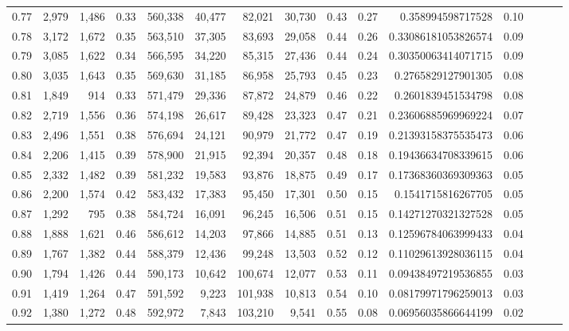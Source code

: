 \begin{tabular}{rrrrrrrrrrrrrrr}
0.77 &   2,979 &  1,486 &  0.33 &  560,338 &   40,477 &   82,021 &   30,730 &  0.43 &  0.27 &     0.358994598717528 &      0.10 \\
0.78 &   3,172 &  1,672 &  0.35 &  563,510 &   37,305 &   83,693 &   29,058 &  0.44 &  0.26 &   0.33086181053826574 &      0.09 \\
0.79 &   3,085 &  1,622 &  0.34 &  566,595 &   34,220 &   85,315 &   27,436 &  0.44 &  0.24 &   0.30350063414071715 &      0.09 \\
0.80 &   3,035 &  1,643 &  0.35 &  569,630 &   31,185 &   86,958 &   25,793 &  0.45 &  0.23 &    0.2765829127901305 &      0.08 \\
0.81 &   1,849 &    914 &  0.33 &  571,479 &   29,336 &   87,872 &   24,879 &  0.46 &  0.22 &    0.2601839451534798 &      0.08 \\
0.82 &   2,719 &  1,556 &  0.36 &  574,198 &   26,617 &   89,428 &   23,323 &  0.47 &  0.21 &   0.23606885969969224 &      0.07 \\
0.83 &   2,496 &  1,551 &  0.38 &  576,694 &   24,121 &   90,979 &   21,772 &  0.47 &  0.19 &   0.21393158375535473 &      0.06 \\
0.84 &   2,206 &  1,415 &  0.39 &  578,900 &   21,915 &   92,394 &   20,357 &  0.48 &  0.18 &   0.19436634708339615 &      0.06 \\
0.85 &   2,332 &  1,482 &  0.39 &  581,232 &   19,583 &   93,876 &   18,875 &  0.49 &  0.17 &   0.17368360369309363 &      0.05 \\
0.86 &   2,200 &  1,574 &  0.42 &  583,432 &   17,383 &   95,450 &   17,301 &  0.50 &  0.15 &    0.1541715816267705 &      0.05 \\
0.87 &   1,292 &    795 &  0.38 &  584,724 &   16,091 &   96,245 &   16,506 &  0.51 &  0.15 &   0.14271270321327528 &      0.05 \\
0.88 &   1,888 &  1,621 &  0.46 &  586,612 &   14,203 &   97,866 &   14,885 &  0.51 &  0.13 &   0.12596784063999433 &      0.04 \\
0.89 &   1,767 &  1,382 &  0.44 &  588,379 &   12,436 &   99,248 &   13,503 &  0.52 &  0.12 &   0.11029613928036115 &      0.04 \\
0.90 &   1,794 &  1,426 &  0.44 &  590,173 &   10,642 &  100,674 &   12,077 &  0.53 &  0.11 &   0.09438497219536855 &      0.03 \\
0.91 &   1,419 &  1,264 &  0.47 &  591,592 &    9,223 &  101,938 &   10,813 &  0.54 &  0.10 &   0.08179971796259013 &      0.03 \\
0.92 &   1,380 &  1,272 &  0.48 &  592,972 &    7,843 &  103,210 &    9,541 &  0.55 &  0.08 &   0.06956035866644199 &      0.02 \\

\end{tabular}
